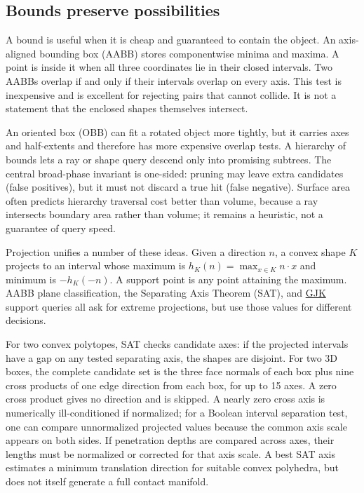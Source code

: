 \subsection{Bounds preserve possibilities}\label{03-visual-computing-i-ch020-bounds-preserve-possibilities}

\hypertarget{03-visual-computing-i-ch020-bounds-preserve-possibilities}{}

A bound is useful when it is cheap and guaranteed to contain the object. An axis-aligned bounding box (AABB) stores componentwise minima and maxima. A point is inside it when all three coordinates lie in their closed intervals. Two AABBs overlap if and only if their intervals overlap on every axis. This test is inexpensive and is excellent for rejecting pairs that cannot collide. It is not a statement that the enclosed shapes themselves intersect.

An oriented box (OBB) can fit a rotated object more tightly, but it carries axes and half-extents and therefore has more expensive overlap tests. A hierarchy of bounds lets a ray or shape query descend only into promising subtrees. The central broad-phase invariant is one-sided: pruning may leave extra candidates (false positives), but it must not discard a true hit (false negative). Surface area often predicts hierarchy traversal cost better than volume, because a ray intersects boundary area rather than volume; it remains a heuristic, not a guarantee of query speed.

Projection unifies a number of these ideas. Given a direction \(n\), a convex shape \(K\) projects to an interval whose maximum is \(h_K(n)=\max_{x\in K}n\cdot x\) and minimum is \(-h_K(-n)\). A support point is any point attaining the maximum. AABB plane classification, the Separating Axis Theorem (SAT), and \hyperref[appendix-aef6177f7b3f]{GJK} support queries all ask for extreme projections, but use those values for different decisions.

For two convex polytopes, SAT checks candidate axes: if the projected intervals have a gap on any tested separating axis, the shapes are disjoint. For two 3D boxes, the complete candidate set is the three face normals of each box plus nine cross products of one edge direction from each box, for up to 15 axes. A zero cross product gives no direction and is skipped. A nearly zero cross axis is numerically ill-conditioned if normalized; for a Boolean interval separation test, one can compare unnormalized projected values because the common axis scale appears on both sides. If penetration depths are compared across axes, their lengths must be normalized or corrected for that axis scale. A best SAT axis estimates a minimum translation direction for suitable convex polyhedra, but does not itself generate a full contact manifold.

